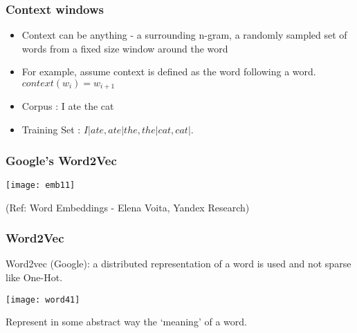 


\begin{frame}[fragile]\frametitle{Context windows}
\begin{itemize}
\item Context can be anything - a surrounding n-gram, a randomly sampled set of words from a fixed size window around the word
\item For example, assume context is defined as the word following a word. $context(w_i) = w_{i+1}$
\item Corpus :  I ate the cat
\item Training Set  : $I|ate,  ate|the ,  the|cat, cat|. $
\end{itemize}
\end{frame}


\begin{frame}[fragile]\frametitle{Google's Word2Vec}
\begin{center}
\texttt{[image: emb11]}
\end{center}

{\tiny (Ref: Word Embeddings - Elena Voita, Yandex Research)}
\end{frame}




\begin{frame}[fragile]\frametitle{Word2Vec}
Word2vec  (Google): a distributed representation of a word is used and not sparse like One-Hot.
\begin{center}
\texttt{[image: word41]}
\end{center}
Represent in some abstract way the `meaning' of a word.

\end{frame}

